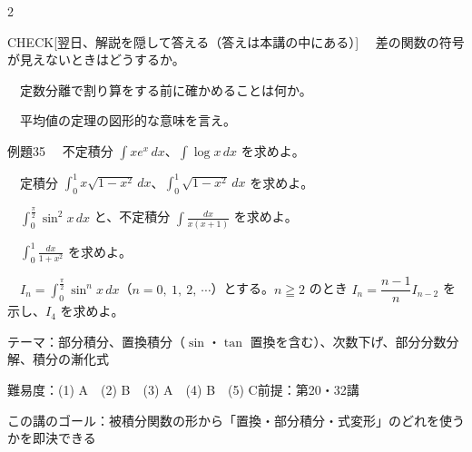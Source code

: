 \documentclass[paper=b5j, fontsize=8pt, fleqn, twoside]{jlreq}
\begin{document}
\begin{multicols*}{2}
  \begin{ptbs}{CHECK}[翌日、解説を隠して答える（答えは本講の中にある）]
    　差の関数の符号が見えないときはどうするか。\par
    　定数分離で割り算をする前に確かめることは何か。\par
    　平均値の定理の図形的な意味を言え。
  \end{ptbs}

  \notefill
\end{multicols*}

\begin{ascolorbox4A}[出典：オリジナル]{例題35}
  　不定積分 $\displaystyle\int xe^x\,dx$、$\displaystyle\int\log x\,dx$ を求めよ。\par
  　定積分 $\displaystyle\int_0^1x\sqrt{1-x^2}\,dx$、$\displaystyle\int_0^1\sqrt{1-x^2}\,dx$ を求めよ。\par
  　$\displaystyle\int_0^{\frac\pi2}\sin^2x\,dx$ と、不定積分 $\displaystyle\int\frac{dx}{x(x+1)}$ を求めよ。\par
  　$\displaystyle\int_0^1\frac{dx}{1+x^2}$ を求めよ。\par
  　$I_n=\displaystyle\int_0^{\frac\pi2}\sin^nx\,dx$（$n=0,\ 1,\ 2,\ \cdots$）とする。$n\geqq2$ のとき $I_n=\dfrac{n-1}nI_{n-2}$ を示し、$I_4$ を求めよ。
\end{ascolorbox4A}

\begin{Data}
  テーマ：部分積分、置換積分（$\sin$・$\tan$ 置換を含む）、次数下げ、部分分数分解、積分の漸化式\par
  難易度：(1) A　(2) B　(3) A　(4) B　(5) C\quad 前提：第20・32講\par
  この講のゴール：被積分関数の形から「置換・部分積分・式変形」のどれを使うかを即決できる
\end{Data}
\end{document}
